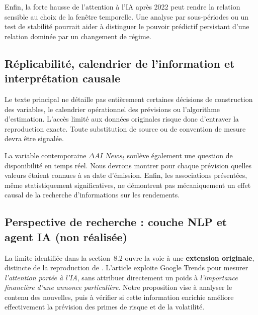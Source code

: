 \documentclass[11pt,a4paper]{article}
\begin{document}
Enfin, la forte hausse de l'attention à l'IA après 2022 peut rendre la relation sensible au choix de la fenêtre temporelle. Une analyse par sous-périodes ou un test de stabilité pourrait aider à distinguer le pouvoir prédictif persistant d'une relation dominée par un changement de régime.

\subsection{Réplicabilité, calendrier de l'information et interprétation causale}
Le texte principal ne détaille pas entièrement certaines décisions de construction des variables, le calendrier opérationnel des prévisions ou l'algorithme d'estimation. L'accès limité aux données originales risque donc d'entraver la reproduction exacte. Toute substitution de source ou de convention de mesure devra être signalée.

La variable contemporaine $\Delta AI\_News_t$ soulève également une question de disponibilité en temps réel. Nous devrons montrer pour chaque prévision quelles valeurs étaient connues à sa date d'émission. Enfin, les associations présentées, même statistiquement significatives, ne démontrent pas mécaniquement un effet causal de la recherche d'informations sur les rendements.

\subsection{Perspective de recherche : couche NLP et agent IA (non réalisée)}
La limite identifiée dans la section~8.2 ouvre la voie à une \textbf{extension originale}, distincte de la reproduction de \cite{SalisuBadmus2026}. L'article exploite Google Trends pour mesurer \emph{l'attention portée à l'IA}, sans attribuer directement un poids à \emph{l'importance financière d'une annonce particulière}. Notre proposition vise à analyser le contenu des nouvelles, puis à vérifier si cette information enrichie améliore effectivement la prévision des primes de risque et de la volatilité.
\end{document}
